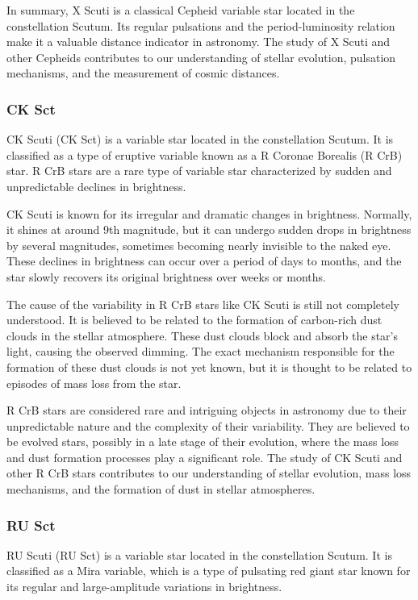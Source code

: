 In summary, X Scuti is a classical Cepheid variable star located in the constellation Scutum. Its regular pulsations and the period-luminosity relation make it a valuable distance indicator in astronomy. The study of X Scuti and other Cepheids contributes to our understanding of stellar evolution, pulsation mechanisms, and the measurement of cosmic distances.
\subsubsection*{ CK Sct }
CK Scuti (CK Sct) is a variable star located in the constellation Scutum. It is classified as a type of eruptive variable known as a R Coronae Borealis (R CrB) star. R CrB stars are a rare type of variable star characterized by sudden and unpredictable declines in brightness.

CK Scuti is known for its irregular and dramatic changes in brightness. Normally, it shines at around 9th magnitude, but it can undergo sudden drops in brightness by several magnitudes, sometimes becoming nearly invisible to the naked eye. These declines in brightness can occur over a period of days to months, and the star slowly recovers its original brightness over weeks or months.

The cause of the variability in R CrB stars like CK Scuti is still not completely understood. It is believed to be related to the formation of carbon-rich dust clouds in the stellar atmosphere. These dust clouds block and absorb the star's light, causing the observed dimming. The exact mechanism responsible for the formation of these dust clouds is not yet known, but it is thought to be related to episodes of mass loss from the star.

R CrB stars are considered rare and intriguing objects in astronomy due to their unpredictable nature and the complexity of their variability. They are believed to be evolved stars, possibly in a late stage of their evolution, where the mass loss and dust formation processes play a significant role. The study of CK Scuti and other R CrB stars contributes to our understanding of stellar evolution, mass loss mechanisms, and the formation of dust in stellar atmospheres.
\subsubsection*{ RU Sct }
RU Scuti (RU Sct) is a variable star located in the constellation Scutum. It is classified as a Mira variable, which is a type of pulsating red giant star known for its regular and large-amplitude variations in brightness.

